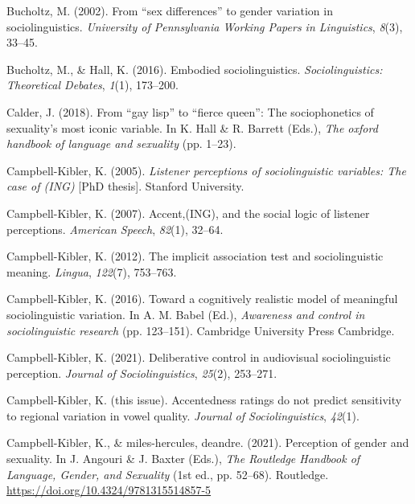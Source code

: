 \documentclass[
  letterpaper,
  DIV=11,
  numbers=noendperiod]{scrartcl}
\newlength{\cslhangindent}
\newenvironment{CSLReferences}[2] %
 {\begin{list}{}{%
  \setlength{\itemindent}{0pt}
  \setlength{\leftmargin}{0pt}
  \setlength{\parsep}{0pt}
  \ifodd #1
   \setlength{\leftmargin}{\cslhangindent}
   \setlength{\itemindent}{-1\cslhangindent}
  \fi
  \setlength{\itemsep}{#2\baselineskip}}}
 {\end{list}}
\begin{document}
\begin{CSLReferences}{1}{0}
Bucholtz, M. (2002). From {``sex differences''} to gender variation in
sociolinguistics. \emph{University of Pennsylvania Working Papers in
Linguistics}, \emph{8}(3), 33--45.

Bucholtz, M., \& Hall, K. (2016). Embodied sociolinguistics.
\emph{Sociolinguistics: Theoretical Debates}, \emph{1}(1), 173--200.

Calder, J. (2018). From {``gay lisp''} to {``fierce queen''}: The
sociophonetics of sexuality's most iconic variable. In K. Hall \& R.
Barrett (Eds.), \emph{The oxford handbook of language and sexuality}
(pp. 1--23).

Campbell-Kibler, K. (2005). \emph{Listener perceptions of
sociolinguistic variables: The case of (ING)} {[}PhD thesis{]}. Stanford
University.

Campbell-Kibler, K. (2007). Accent,(ING), and the social logic of
listener perceptions. \emph{American Speech}, \emph{82}(1), 32--64.

Campbell-Kibler, K. (2012). The implicit association test and
sociolinguistic meaning. \emph{Lingua}, \emph{122}(7), 753--763.

Campbell-Kibler, K. (2016). Toward a cognitively realistic model of
meaningful sociolinguistic variation. In A. M. Babel (Ed.),
\emph{Awareness and control in sociolinguistic research} (pp. 123--151).
Cambridge University Press Cambridge.

Campbell-Kibler, K. (2021). Deliberative control in audiovisual
sociolinguistic perception. \emph{Journal of Sociolinguistics},
\emph{25}(2), 253--271.

Campbell-Kibler, K. (this issue). Accentedness ratings do not predict
sensitivity to regional variation in vowel quality. \emph{Journal of
Sociolinguistics}, \emph{42}(1).

Campbell-Kibler, K., \& miles-hercules, deandre. (2021). Perception of
gender and sexuality. In J. Angouri \& J. Baxter (Eds.), \emph{The
{Routledge} {Handbook} of {Language}, {Gender}, and {Sexuality}} (1st
ed., pp. 52--68). Routledge.
\url{https://doi.org/10.4324/9781315514857-5}


\end{CSLReferences}
\end{document}
